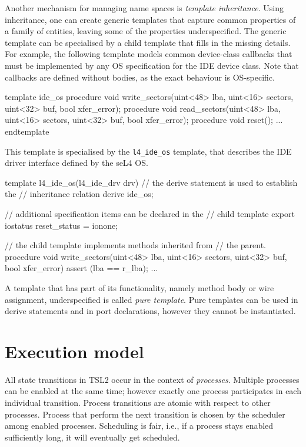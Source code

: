 \documentclass{report}
\newcommand{\src}[1]{\texttt{#1}}
\newcommand{\tsl}{TSL2 }
\begin{document}
Another mechanism for managing name spaces is \emph{template 
inheritance}.  Using inheritance, one can create generic templates 
that capture common properties of a family of entities, leaving 
some of the properties underspecified.  The generic template can 
be specialised by a child template that fills in the missing 
details.  For example, the following template models common 
device-class callbacks that must be implemented by any OS 
specification for the IDE device class.  Note that callbacks are 
defined without bodies, as the exact behaviour is OS-specific.
\begin{tsllisting}{}
template ide_os
  procedure void write_sectors(uint<48> lba, 
    uint<16> sectors, uint<32> buf, bool xfer_error);
  procedure void read_sectors(uint<48> lba, 
    uint<16> sectors, uint<32> buf, bool xfer_error);
  procedure void reset();
  ...
endtemplate
\end{tsllisting}
This template is specialised by the \src{l4\_ide\_os} template,
that describes the IDE driver interface defined by the seL4 OS.
\begin{tsllisting}{}
template l4_ide_os(l4_ide_drv drv)
  // the derive statement is used to establish the 
  // inheritance relation
  derive ide_os;

  // additional specification items can be declared in the 
  // child template
  export iostatus reset_status = ionone;

  // the child template implements methods inherited from 
  // the parent.
  procedure void write_sectors(uint<48> lba, 
    uint<16> sectors, uint<32> buf, bool xfer_error)
  {
    assert (lba == r_lba);
    ...
  }
\end{tsllisting}

A template that has part of its functionality, namely method body 
or wire assignment, underspecified is called \emph{pure template}.  
Pure templates can be used in derive statements and in port 
declarations, however they cannot be instantiated.


\section{Execution model}\label{s:o:execmodel}

All state transitions in \tsl occur in the context of 
\emph{processes}.  Multiple processes can be enabled at the same 
time; however exactly one process participates in each individual 
transition.  Process transitions are atomic with respect to other 
processes.  Process that perform the next transition is chosen by 
the scheduler among enabled processes.  Scheduling is fair, i.e., 
if a process stays enabled sufficiently long, it will eventually 
get scheduled.
\end{document}
